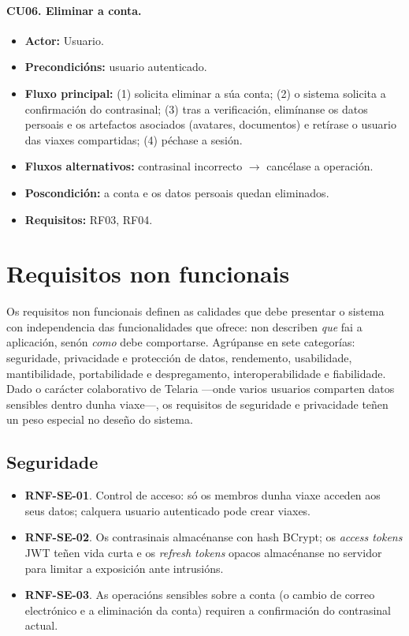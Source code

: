 \paragraph*{CU06. Eliminar a conta.}
\begin{itemize}[noitemsep,topsep=2pt]
  \item \textbf{Actor:} Usuario.
  \item \textbf{Precondicións:} usuario autenticado.
  \item \textbf{Fluxo principal:} (1) solicita eliminar a súa conta; (2) o sistema solicita a confirmación do contrasinal; (3) tras a verificación, elimínanse os datos persoais e os artefactos asociados (avatares, documentos) e retírase o usuario das viaxes compartidas; (4) péchase a sesión.
  \item \textbf{Fluxos alternativos:} contrasinal incorrecto $\rightarrow$ cancélase a operación.
  \item \textbf{Poscondición:} a conta e os datos persoais quedan eliminados.
  \item \textbf{Requisitos:} RF03, RF04.
\end{itemize}

\section{Requisitos non funcionais}

Os requisitos non funcionais definen as calidades que debe presentar o sistema con
independencia das funcionalidades que ofrece: non describen \textit{que} fai a
aplicación, senón \textit{como} debe comportarse. Agrúpanse en sete categorías:
seguridade, privacidade e protección de datos, rendemento, usabilidade, mantibilidade,
portabilidade e despregamento, interoperabilidade e fiabilidade. Dado o carácter
colaborativo de Telaria —onde varios usuarios comparten datos sensibles dentro dunha
viaxe—, os requisitos de seguridade e privacidade teñen un peso especial no deseño
do sistema.

\subsection{Seguridade}

\begin{itemize}
  \item \textbf{RNF-SE-01}. Control de acceso: só os membros dunha viaxe acceden aos seus datos; calquera usuario autenticado pode crear viaxes.
  \item \textbf{RNF-SE-02}. Os contrasinais almacénanse con hash BCrypt; os \textit{access tokens} JWT teñen vida curta e os \textit{refresh tokens} opacos almacénanse no servidor para limitar a exposición ante intrusións.
  \item \textbf{RNF-SE-03}. As operacións sensibles sobre a conta (o cambio de correo electrónico e a eliminación da conta) requiren a confirmación do contrasinal actual.
\end{itemize}

